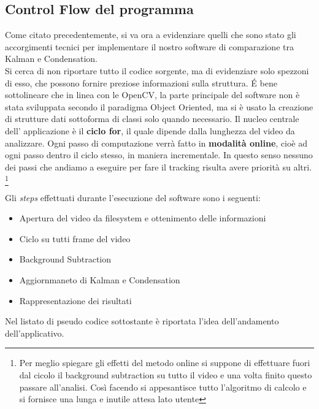 \subsection{Control Flow del programma}\label{ControlFlow}
Come citato precedentemente, si va ora a evidenziare quelli che sono stato gli accorgimenti tecnici per implementare il nostro software di comparazione tra Kalman e Condensation.\\
Si cerca di non riportare tutto il codice sorgente, ma di evidenziare solo spezzoni di esso, che possono fornire preziose informazioni sulla struttura. \'E bene sottolineare che in linea con le OpenCV, la parte principale del software non è stata sviluppata secondo il paradigma Object Oriented, ma si è usato la creazione di strutture dati sottoforma di classi solo quando necessario.
Il nucleo centrale dell' applicazione è il \textbf{ciclo for}, il quale dipende dalla lunghezza del video da analizzare. Ogni passo di computazione verrà fatto in \textbf{modalità online}, cioè ad ogni passo dentro il ciclo stesso, in maniera incrementale. In questo senso nessuno dei passi che andiamo a eseguire per fare il tracking risulta avere priorità su altri. \footnote{Per meglio spiegare gli effetti del metodo online si suppone di effettuare fuori dal cicolo il background subtraction su tutto il video e una volta finito questo passare all'analisi. Così facendo si appesantisce tutto l'algoritmo di calcolo e si fornisce una lunga e inutile attesa lato utente} \\

\newpage

Gli \textit{steps} effettuati durante l'esecuzione del software sono i seguenti:
\begin{itemize}
\item Apertura del video da filesystem e ottenimento delle informazioni
\item Ciclo su tutti frame del video
\item Background Subtraction
\item Aggiornmaneto di Kalman e Condensation
\item Rappresentazione dei risultati 
\end{itemize}

Nel listato di pseudo codice sottostante è riportata l'idea dell'andamento dell'applicativo.


